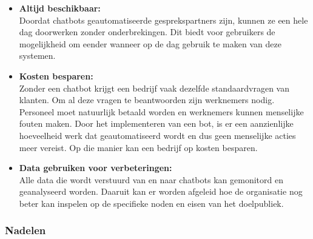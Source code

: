 \begin{itemize}
    \item \textbf{Altijd beschikbaar:} \\
    
    Doordat chatbots geautomatiseerde gesprekspartners zijn, kunnen ze een hele dag doorwerken zonder onderbrekingen. Dit biedt voor gebruikers de mogelijkheid om eender wanneer op de dag gebruik te maken van deze systemen. \\
    
    \item \textbf{Kosten besparen:} \\
    
    Zonder een chatbot krijgt een bedrijf vaak dezelfde standaardvragen van klanten. Om al deze vragen te beantwoorden zijn werknemers nodig. Personeel moet natuurlijk betaald worden en werknemers kunnen menselijke fouten maken. Door het implementeren van een bot, is er een aanzienlijke hoeveelheid werk dat geautomatiseerd wordt en dus geen menselijke acties meer vereist. Op die manier kan een bedrijf op kosten besparen. \\
    
    \item \textbf{Data gebruiken voor verbeteringen:} \\
    
    Alle data die wordt verstuurd van en naar chatbots kan gemonitord en geanalyseerd worden. Daaruit kan er worden afgeleid hoe de organisatie nog beter kan inspelen op de specifieke noden en eisen van het doelpubliek. \\ 
    
\end{itemize}

\subsubsection{Nadelen}
\label{subsubsec:chatbots-voor-en-nadelen-nadelen}

